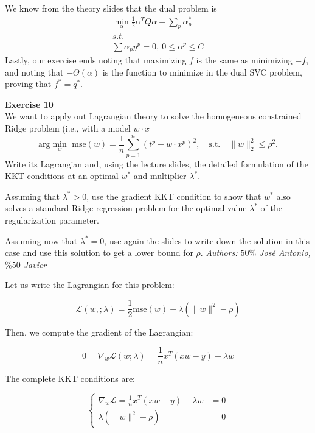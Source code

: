 \documentclass[11pt,table]{article}
\newenvironment{problem}[2][Exercise]
{ \begin{mdframed}[backgroundcolor=gray!20] \textbf{#1 #2} \\}
	{\hspace{0.0cm}\newline\newline \emph{Authors: \(50\%\) José Antonio, \(\%50\) Javier}  \end{mdframed}}
\newcommand\norm[1]{\lVert#1\rVert}
\begin{document}
We know from the theory slides that the dual problem is
\begin{align*}
	\min_{\alpha} \frac{1}{2}\alpha^T Q \alpha - \sum_p \alpha^*_p \\
	s.t.                                                           \\
	\sum \alpha_p y^p = 0, \ 0 \leq \alpha^p \leq C
\end{align*}
Lastly, our exercise ends noting that maximizing \(f\) is the same as minimizing \(-f\), and noting that \(-\Theta(\alpha)\) is the function to minimize in the dual SVC problem, proving that \(f^* = q^*\).\\




\begin{problem}{10}
We want to apply out Lagrangian theory to solve the homogeneous constrained Ridge problem (i.e., with a model \(w\cdot x\)
\[
	\text{arg}\min_{w} \text{ mse}(w) = \frac{1}{n} \sum_{p=1}^n (t^p - w \cdot x^p)^2, \quad \text{s.t.} \quad \norm{w}_2^2 \leq \rho^2.
\]
Write its Lagrangian and, using the lecture slides, the detailed formulation of the KKT conditions at an optimal \(w^*\) and multiplier \(\lambda^*\).

Assuming that \(\lambda^* > 0\), use the gradient KKT condition to show that \(w^*\) also solves a standard Ridge regression problem for the optimal value \(\lambda^*\) of the regularization parameter.

Assuming now that \(\lambda^* = 0\), use again the slides to write down the solution in this case and use this solution to get a lower bound for \(\rho\).
\end{problem}

Let us write the Lagrangian for this problem:

\[
	\mathcal L(w, ; \lambda) = \frac{1}{2} \text{mse}(w) + \lambda \left(\parallel w \parallel^2 - \rho\right)
\]

Then, we compute the gradient of the Lagrangian:

\[
	0 = \nabla_w \mathcal L(w; \lambda) = \frac{1}{n}x^T(xw - y) + \lambda w
\]

The complete KKT conditions are:

\begin{equation*}
	\begin{cases}
		\nabla_w \mathcal L = \frac{1}{n}x^T(xw - y) + \lambda w & = 0 \\
		\lambda \left(\parallel w \parallel^2 - \rho\right)      & = 0
	\end{cases}
\end{equation*}
\end{document}

